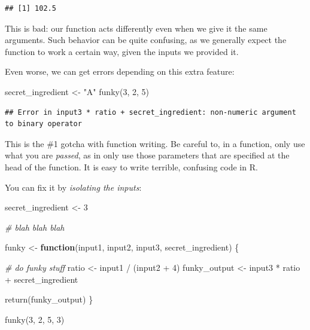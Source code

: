 \documentclass[
]{book}
\newenvironment{Shaded}{\begin{snugshade}}{\end{snugshade}}
\newcommand{\CommentTok}[1]{\textcolor[rgb]{0.56,0.35,0.01}{\textit{#1}}}
\newcommand{\ControlFlowTok}[1]{\textcolor[rgb]{0.13,0.29,0.53}{\textbf{#1}}}
\newcommand{\DecValTok}[1]{\textcolor[rgb]{0.00,0.00,0.81}{#1}}
\newcommand{\FunctionTok}[1]{\textcolor[rgb]{0.00,0.00,0.00}{#1}}
\newcommand{\NormalTok}[1]{#1}
\newcommand{\OtherTok}[1]{\textcolor[rgb]{0.56,0.35,0.01}{#1}}
\newcommand{\SpecialCharTok}[1]{\textcolor[rgb]{0.00,0.00,0.00}{#1}}
\newcommand{\StringTok}[1]{\textcolor[rgb]{0.31,0.60,0.02}{#1}}
\begin{document}
\begin{verbatim}
## [1] 102.5
\end{verbatim}

This is bad: our function acts differently even when we give it the same arguments.
Such behavior can be quite confusing, as we generally expect the function to work a certain way, given the inputs we provided it.

Even worse, we can get errors depending on this extra feature:

\begin{Shaded}
\begin{Highlighting}[]
\NormalTok{secret\_ingredient }\OtherTok{\textless{}{-}} \StringTok{"A"}
\FunctionTok{funky}\NormalTok{(}\DecValTok{3}\NormalTok{, }\DecValTok{2}\NormalTok{, }\DecValTok{5}\NormalTok{)}
\end{Highlighting}
\end{Shaded}

\begin{verbatim}
## Error in input3 * ratio + secret_ingredient: non-numeric argument to binary operator
\end{verbatim}

This is the \#1 gotcha with function writing.
Be careful to, in a function, only use what you are \emph{passed}, as in only use those parameters that are specified at the head of the function.
It is easy to write terrible, confusing code in R.

You can fix it by \emph{isolating the inputs}:

\begin{Shaded}
\begin{Highlighting}[]
\NormalTok{secret\_ingredient }\OtherTok{\textless{}{-}} \DecValTok{3}

\CommentTok{\# blah blah blah}

\NormalTok{funky }\OtherTok{\textless{}{-}} \ControlFlowTok{function}\NormalTok{(input1, input2, input3, secret\_ingredient) \{}
  
  \CommentTok{\# do funky stuff}
\NormalTok{  ratio }\OtherTok{\textless{}{-}}\NormalTok{ input1 }\SpecialCharTok{/}\NormalTok{ (input2 }\SpecialCharTok{+} \DecValTok{4}\NormalTok{)}
\NormalTok{  funky\_output }\OtherTok{\textless{}{-}}\NormalTok{ input3 }\SpecialCharTok{*}\NormalTok{ ratio }\SpecialCharTok{+}\NormalTok{ secret\_ingredient}
  
  \FunctionTok{return}\NormalTok{(funky\_output)  }
\NormalTok{\}}

\FunctionTok{funky}\NormalTok{(}\DecValTok{3}\NormalTok{, }\DecValTok{2}\NormalTok{, }\DecValTok{5}\NormalTok{, }\DecValTok{3}\NormalTok{)}
\end{Highlighting}
\end{Shaded}
\end{document}
